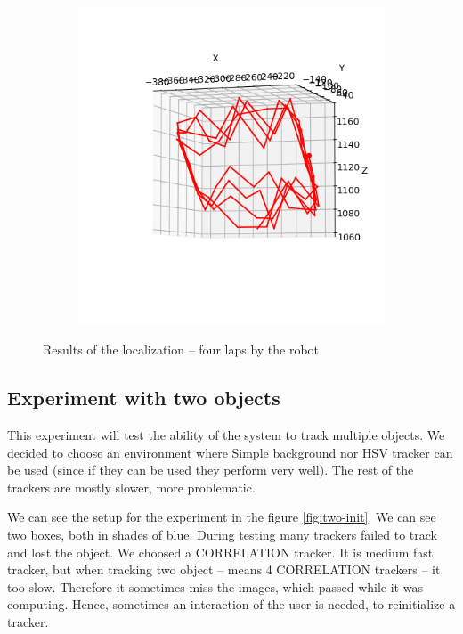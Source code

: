 \begin{figure}
\begin{subfigure}{0.48\linewidth}
	\includegraphics[width=\linewidth]{img/experiments/square-ugly.png}
\end{subfigure}
\caption{Results of the localization -- four laps by the robot}
\label{fig:square-results}
\end{figure}

\subsection{Experiment with two objects}

This experiment will test the ability of the system to track multiple objects.
We decided to choose an environment where Simple background nor HSV tracker can
be used (since if they can be used they perform very well). The rest of the
trackers are mostly slower, more problematic.

We can see the setup for the experiment in the figure \ref{fig:two-init}. We
can see two boxes, both in shades of blue. During testing many trackers failed
to track and lost the object. We choosed a CORRELATION tracker. It is medium
fast tracker, but when tracking two object -- means 4 CORRELATION trackers --
it too slow. Therefore it sometimes miss the images, which passed while it was
computing. Hence, sometimes an interaction of the user is needed, to
reinitialize a tracker.

